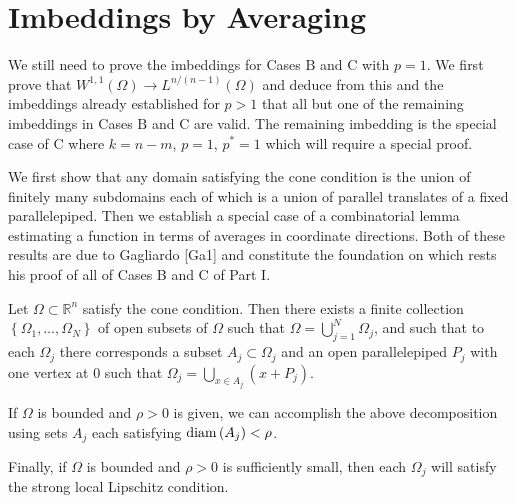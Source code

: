 \section{Imbeddings by Averaging}

\begin{para}
  We still need to prove the imbeddings for Cases $\mathrm{B}$ and $\mathrm{C}$ with $p=1$.
  We first prove that $W^{1,1}(\Omega) \rightarrow L^{n /(n-1)}(\Omega)$ and deduce from this and 
  the imbeddings already established for $p>1$ that all but one of the remaining imbeddings in 
  Cases $\mathrm{B}$ and $\mathrm{C}$ are valid. The remaining imbedding is the special case
  of $\mathrm{C}$ where $k=n-m$, $p=1$, $p^*=1$ which will require a special proof.
  
  We first show that any domain satisfying the cone condition is the union of finitely many 
  subdomains each of which is a union of parallel translates of a fixed parallelepiped.
  Then we establish a special case of a combinatorial lemma estimating a function in terms of
  averages in coordinate directions. Both of these results are due to Gagliardo [Ga1] and
  constitute the foundation on which rests his proof of all of Cases B and C of Part I.
\end{para}


\begin{lemma}
  Let $\Omega \subset \mathbb{R}^n$ satisfy the cone condition. Then there exists a finite 
  collection $\left\{\Omega_1, \ldots, \Omega_N\right\}$ of open subsets of $\Omega$ such
  that $\Omega=\bigcup_{j=1}^N \Omega_j$, and such that to each $\Omega_j$ there corresponds a 
  subset $A_j \subset \Omega_j$ and an open parallelepiped $P_j$ with one vertex at 0 such that 
  $\Omega_j=\bigcup_{x \in A_j}\left(x+P_j\right)$.
  
  If $\Omega$ is bounded and $\rho>0$ is given, we can accomplish the above decomposition using 
  sets $A_j$ each satisfying $\operatorname{diam}\left(A_j\right)<\rho$.
  
  Finally, if $\Omega$ is bounded and $\rho>0$ is sufficiently small, then each $\Omega_j$ will 
  satisfy the strong local Lipschitz condition.
\end{lemma}


